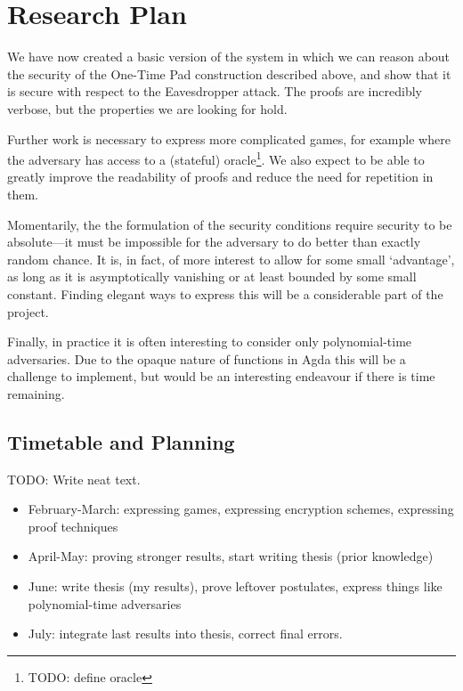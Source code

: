 \chapter{Research Plan}


We have now created a basic version of the system in which we can reason about the security of the One-Time Pad
construction described above, and show that it is secure with respect to the Eavesdropper attack.  The proofs are
incredibly verbose, but the properties we are looking for hold.  

Further work is necessary to express more complicated games, for example where the adversary has access to a
(stateful) oracle\footnote{TODO: define oracle}.  We also expect to be able to greatly improve the readability of
proofs and reduce the need for repetition in them.

Momentarily, the the formulation of the security conditions require security to be absolute---it must be impossible
for the adversary to do better than exactly random chance.  It is, in fact, of more interest to allow for some small
`advantage', as long as it is asymptotically vanishing or at least bounded by some small constant.  Finding elegant
ways to express this will be a considerable part of the project.

Finally, in practice it is often interesting to consider only polynomial-time adversaries.  Due to the opaque nature
of functions in Agda this will be a challenge to implement, but would be an interesting endeavour if there is
time remaining.

\section{Timetable and Planning}

TODO: Write neat text.
\begin{itemize}
    \itemsep0em
    \item February-March: expressing games, expressing encryption schemes, expressing proof techniques
    \item April-May: proving stronger results, start writing thesis (prior knowledge)
    \item June: write thesis (my results), prove leftover postulates, express things like polynomial-time adversaries
    \item July: integrate last results into thesis, correct final errors.
\end{itemize}

